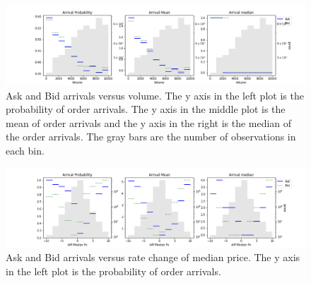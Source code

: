 \documentclass[letterpaper,12pt]{article}
\numberwithin{equation}{section}
\begin{document}
\begin{figure}
    \hspace*{-0.6in}
    \includegraphics[scale = 0.5]{figs/densities/density_Volume.png}
    \caption{\small Ask and Bid arrivals versus volume. The y axis in the left plot is the probability of order arrivals. The y axis in the middle plot is the mean of order arrivals and the y axis in the right is the median of the order arrivals. The gray bars are the number of observations in each bin. }
    \label{sec3:fig:volume_density}
\end{figure}

\begin{figure}[H]
    \hspace*{-0.6in}
    \includegraphics[scale = 0.5]{figs/densities/density_diff Median Px.png}
    \caption{\small Ask and Bid arrivals versus rate change of median price. The y axis in the left plot is the probability of order arrivals.  }
    \label{sec3:fig:diff_median_px_density}
\end{figure}
\end{document}
